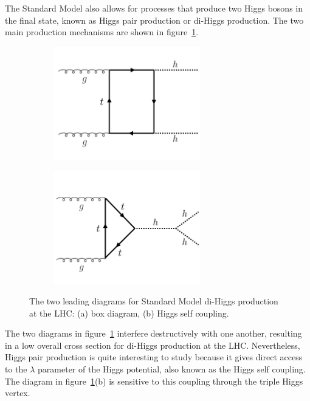 The Standard Model also allows for processes that produce two Higgs bosons in the final state, known as Higgs pair production or di-Higgs production. The two main production mechanisms are shown in figure~\ref{fig:diHiggs}.
%
\begin{figure}[h!]
  \centering
  \captionsetup{justification=centering}

   \begin{subfigure}[t]{0.5\textwidth}
        \centering
        \includegraphics[width=0.7\textwidth]{figures/HH_box}
        \caption{}
    \end{subfigure}%
    \begin{subfigure}[t]{0.5\textwidth}
        \centering
        \includegraphics[width=0.7\textwidth]{figures/HH_lambda}
        \caption{}
    \end{subfigure}
   \caption{The two leading diagrams for Standard Model di-Higgs production at the LHC: (a) box diagram, (b) Higgs self coupling.}
  \label{fig:diHiggs}
\end{figure}
%
The two diagrams in figure~\ref{fig:diHiggs} interfere destructively with one another, resulting in a low overall cross section for di-Higgs production at the LHC. Nevertheless, Higgs pair production is quite interesting to study because it gives direct access to the $\lambda$ parameter of the Higgs potential, also known as the Higgs self coupling. The diagram in figure~\ref{fig:diHiggs}(b) is sensitive to this coupling through the triple Higgs vertex.  

